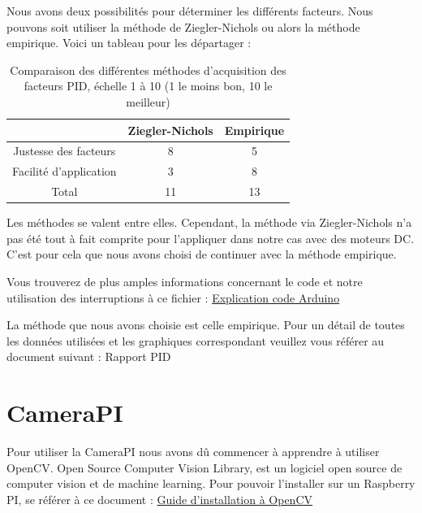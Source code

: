 \documentclass[
	a4paper,									%
	11pt,										%
	twoside,									%
	openright,									%
	notitlepage,									%
	parskip=half,								%
]{scrreprt}										%
\begin{document}
Nous avons deux possibilités pour déterminer les différents facteurs. Nous pouvons soit utiliser la méthode 
de Ziegler-Nichols ou alors la méthode empirique. Voici un tableau pour les départager : 

\begin{table}[!ht]
    \begin{center}
        \vspace{5mm}
        \label{tab:table7}
        \begin{tabular}{c|c|c} %
            \toprule
            \textbf{ } & \textbf{Ziegler-Nichols} & \textbf{Empirique}\\
            \midrule
            Justesse des facteurs & 8 & 5\\
            Facilité d'application & 3 & 8\\
            \midrule
			Total & 11 & 13\\
            \bottomrule
        \end{tabular}
    \end{center}    
	\caption{Comparaison des différentes méthodes d'acquisition des facteurs PID, échelle 1 à 10 (1 le moins bon, 10 le meilleur)}
\end{table}

Les méthodes se valent entre elles. Cependant, la méthode via Ziegler-Nichols n'a pas été tout à fait comprite pour l'appliquer 
dans notre cas avec des moteurs DC. C'est pour cela que nous avons choisi de continuer avec la méthode empirique. \par


Vous trouverez de plus amples informations concernant le code et notre utilisation des interruptions
à ce fichier : \href{run:./Code_Arduino.pdf}{Explication code Arduino}

La méthode que nous avons choisie est celle empirique. Pour un détail de toutes les données utilisées 
et les graphiques correspondant veuillez vous référer au document suivant : Rapport PID \par



\section{CameraPI}

Pour utiliser la CameraPI nous avons dû commencer à apprendre à utiliser OpenCV. 
Open Source Computer Vision Library, est un logiciel open source de computer vision et de machine learning. 
Pour pouvoir l'installer sur un Raspberry PI, se référer à ce document : \href{run:./Installation_OpenCV.pdf}{Guide d'installation à OpenCV}\par
\end{document}
